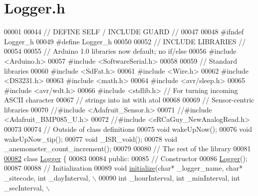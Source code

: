 \hypertarget{Logger_8h_source}{}\section{Logger.\+h}

\begin{DoxyCode}
00001 
00044 \textcolor{comment}{// DEFINE SELF / INCLUDE GUARD //}
00047 \textcolor{comment}{}
00048 \textcolor{preprocessor}{#ifndef Logger\_h}
00049 \textcolor{preprocessor}{#define Logger\_h}
00050 
00052 \textcolor{comment}{// INCLUDE LIBRARIES //}
00054 \textcolor{comment}{}
00055 \textcolor{comment}{// Arduino 1.0 libraries now default; no if/else}
00056 \textcolor{preprocessor}{#include <Arduino.h>}
00057 \textcolor{preprocessor}{#include <SoftwareSerial.h>}
00058 
00059 \textcolor{comment}{// Standard libraries}
00060 \textcolor{preprocessor}{#include <SdFat.h>}
00061 \textcolor{preprocessor}{#include <Wire.h>}
00062 \textcolor{preprocessor}{#include <DS3231.h>}
00063 \textcolor{preprocessor}{#include <math.h>}
00064 \textcolor{preprocessor}{#include <avr/sleep.h>}
00065 \textcolor{preprocessor}{#include <avr/wdt.h>}
00066 \textcolor{preprocessor}{#include <stdlib.h>} \textcolor{comment}{// For turning incoming ASCII character}
00067                     \textcolor{comment}{// strings into int with atol}
00068 
00069 \textcolor{comment}{// Sensor-centric libraries}
00070 \textcolor{comment}{//#include <Adafruit\_Sensor.h>}
00071 \textcolor{comment}{//#include <Adafruit\_BMP085\_U.h>}
00072 \textcolor{comment}{//#include <eRCaGuy\_NewAnalogRead.h>}
00073 
00074 \textcolor{comment}{// Outside of class definitions}
00075 \textcolor{keywordtype}{void} wakeUpNow();
00076 \textcolor{keywordtype}{void} wakeUpNow\_tip();
00077 \textcolor{keywordtype}{void} \_ISR\_void();
00078 \textcolor{keywordtype}{void} \_anemometer\_count\_increment();
00079 
00080 \textcolor{comment}{// The rest of the library}
00081 
\hypertarget{Logger_8h_source.tex_l00082}{}\hyperlink{classLogger}{00082} \textcolor{keyword}{class }\hyperlink{classLogger}{Logger} \{
00083 
00084   \textcolor{keyword}{public}:
00085     \textcolor{comment}{// Constructor}
00086     \hyperlink{classLogger_abc41bfb031d896170c7675fa96a6b30c}{Logger}();
00087     
00088     \textcolor{comment}{// Initialization}
00089     \textcolor{keywordtype}{void} \hyperlink{classLogger_a9495e2c8e63850f3c7cfcc31e9d73ffe}{initialize}(\textcolor{keywordtype}{char}* \_logger\_name, \textcolor{keywordtype}{char}* \_sitecode, \textcolor{keywordtype}{int} \_dayInterval, \(\backslash\)
00090          \textcolor{keywordtype}{int} \_hourInterval, \textcolor{keywordtype}{int} \_minInterval, \textcolor{keywordtype}{int} \_secInterval, \(\backslash\)

\end{DoxyCode}
